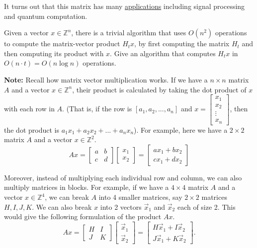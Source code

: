 \documentclass[11pt,addpoints]{exam}
\begin{document}
\begin{questions}
It turns out that this matrix has many \href{https://en.wikipedia.org/wiki/Hadamard_matrix#Practical_applications}{applications} including signal processing and quantum computation.

Given a vector $x \in \mathbb{Z}^{n}$, there is a trivial algorithm that uses $O(n^2)$ operations to compute the matrix-vector product $H_t x$, by first computing the matrix $H_t$ and then computing its product with $x$.
Give an algorithm that computes $H_t x$ in $O(n \cdot t)=O(n\log n)$ operations. 


\textbf{Note: } Recall how matrix vector multiplication works. If we have a $n\times n$ matrix $A$ and a vector $x\in \mathbb{Z}^n$, their product is calculated by taking the dot product of $x$ with each row in $A$. (That is, if the row is $[a_1, a_2, ..., a_n]$ and $x = \begin{bmatrix}
       x_1 \\
       x_2 \\
       \vdots \\
       x_n
       \end{bmatrix}$, then the dot product is $a_1x_1 + a_2x_2 + ... + a_nx_n$). For example, here we have a $2\times 2$ matrix $A$ and a vector $x\in \mathbb{Z}^2$.
\begin{equation*}
       A x = 
       \begin{bmatrix}
       a & b \\
       c & d
       \end{bmatrix}
       \begin{bmatrix}
       x_1 \\
       x_2
       \end{bmatrix}
       = 
       \begin{bmatrix}
       ax_1 + bx_2 \\
       cx_1 + dx_2
       \end{bmatrix}
   \end{equation*}

   Moreover, instead of multiplying each individual row and column, we can also multiply matrices in blocks. For example, if we have a $4\times 4$ matrix $A$ and a vector $x\in \mathbb{Z}^4$, we can break $A$ into 4 smaller matrices, say $2\times2$ matrices $H, I, J, K$. We can also break $x$ into 2 vectors $\vec{x}_1$ and $\vec{x}_2$ each of size 2. This would give the following formulation of the product $Ax$.
    \begin{equation*}
       A x = 
       \begin{bmatrix}
       H & I \\
       J & K
       \end{bmatrix}
       \begin{bmatrix}
       \vec{x}_1 \\
       \vec{x}_2
       \end{bmatrix}
       = 
       \begin{bmatrix}
       H\vec{x}_1 + I\vec{x}_2 \\
       J\vec{x}_1 + K\vec{x}_2
       \end{bmatrix}.
   \end{equation*}


\end{questions}
\end{document}
